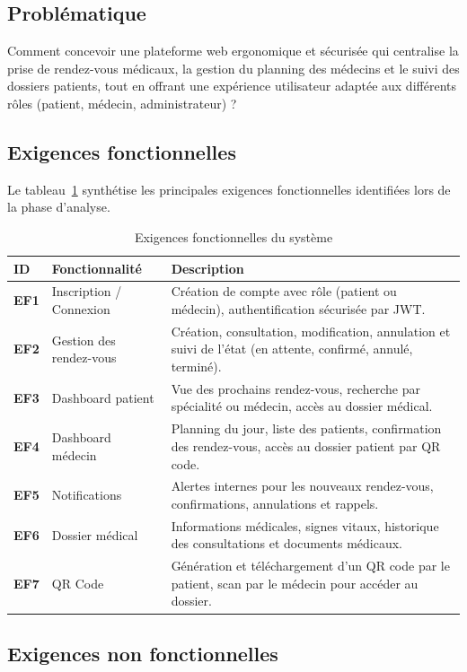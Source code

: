 \documentclass[12pt, a4paper]{article}
\begin{document}
\subsection{Problématique}

Comment concevoir une plateforme web ergonomique et sécurisée qui centralise la prise de rendez-vous médicaux, la gestion du planning des médecins et le suivi des dossiers patients, tout en offrant une expérience utilisateur adaptée aux différents rôles (patient, médecin, administrateur) ?

\subsection{Exigences fonctionnelles}

Le tableau~\ref{tab:ef} synthétise les principales exigences fonctionnelles identifiées lors de la phase d'analyse.

\begin{table}[h!]
\centering
\caption{Exigences fonctionnelles du système}
\label{tab:ef}
\small
\begin{tabular}{>{\bfseries}p{1cm} p{4cm} p{8cm}}
\toprule
ID & Fonctionnalité & Description \\
\midrule
EF1 & Inscription / Connexion & Création de compte avec rôle (patient ou médecin), authentification sécurisée par JWT. \\
EF2 & Gestion des rendez-vous & Création, consultation, modification, annulation et suivi de l'état (en attente, confirmé, annulé, terminé). \\
EF3 & Dashboard patient & Vue des prochains rendez-vous, recherche par spécialité ou médecin, accès au dossier médical. \\
EF4 & Dashboard médecin & Planning du jour, liste des patients, confirmation des rendez-vous, accès au dossier patient par QR code. \\
EF5 & Notifications & Alertes internes pour les nouveaux rendez-vous, confirmations, annulations et rappels. \\
EF6 & Dossier médical & Informations médicales, signes vitaux, historique des consultations et documents médicaux. \\
EF7 & QR Code & Génération et téléchargement d'un QR code par le patient, scan par le médecin pour accéder au dossier. \\
\bottomrule
\end{tabular}
\end{table}

\subsection{Exigences non fonctionnelles}
\end{document}
